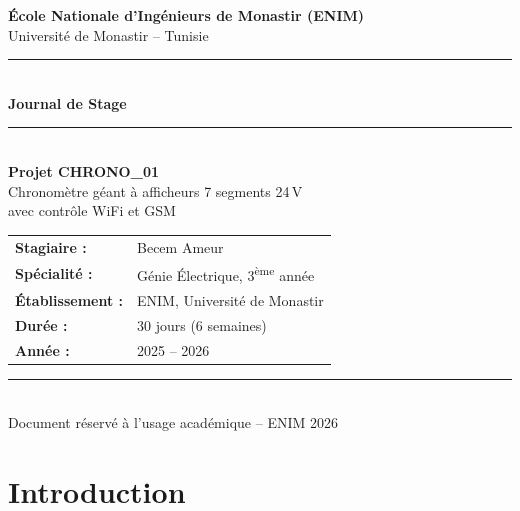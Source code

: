 \documentclass[12pt,a4paper]{article}
\begin{document}

\begin{titlepage}
    \begin{center}
        \vspace*{1.5cm}
        {\Large \textbf{École Nationale d'Ingénieurs de Monastir (ENIM)}}\\[0.3cm]
        {\large Université de Monastir -- Tunisie}\\[1.5cm]
        \rule{\linewidth}{1.2pt}\\[0.4cm]
        {\huge \textbf{Journal de Stage}}\\[0.3cm]
        \rule{\linewidth}{1.2pt}\\[1.0cm]
        {\LARGE \textbf{Projet CHRONO\_01}}\\[0.4cm]
        {\large Chronomètre géant à afficheurs 7 segments 24\,V\\
        avec contrôle WiFi et GSM}\\[2.0cm]

        \begin{tabular}{ll}
            \textbf{Stagiaire :}    & Becem Ameur \\[0.2cm]
            \textbf{Spécialité :}   & Génie Électrique, 3\textsuperscript{ème} année \\[0.2cm]
            \textbf{Établissement :}& ENIM, Université de Monastir \\[0.2cm]
            \textbf{Durée :}        & 30 jours (6 semaines) \\[0.2cm]
            \textbf{Année :}        & 2025 -- 2026 \\
        \end{tabular}

        \vfill
        \rule{\linewidth}{0.6pt}\\[0.2cm]
        {\small Document réservé à l'usage académique -- ENIM 2026}
    \end{center}
\end{titlepage}

\newpage
\tableofcontents
\newpage

\section*{Introduction}
\end{document}
